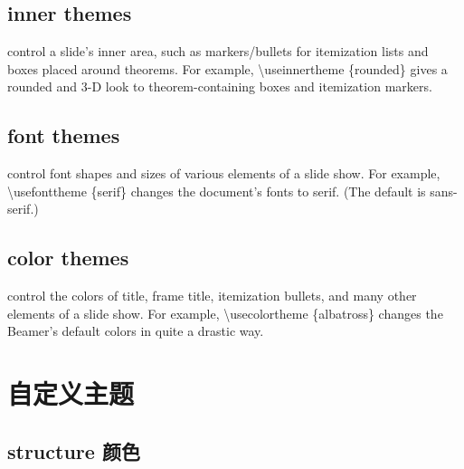 \begin{column}{0.5\textwidth}
\subsection{inner themes}

control a slide’s inner area, such as markers/bullets for itemization lists and boxes placed around theorems. For example, {\ttfamily \textbackslash useinnertheme \{rounded\}} gives a rounded and 3-D look to theorem-containing boxes and itemization markers.

\subsection{font themes}

control font shapes and sizes of various elements of a slide show. For example, {\ttfamily \textbackslash usefonttheme \{serif\}} changes the document’s fonts to serif. (The default is sans-serif.)

\subsection{color themes}

control the colors of title, frame title, itemization bullets, and many other elements of a slide show. For example, {\ttfamily \textbackslash usecolortheme \{albatross\}} changes the Beamer’s default colors in quite a drastic way.

\section{自定义主题}

\subsection{{\ttfamily structure} 颜色}

\end{column}
